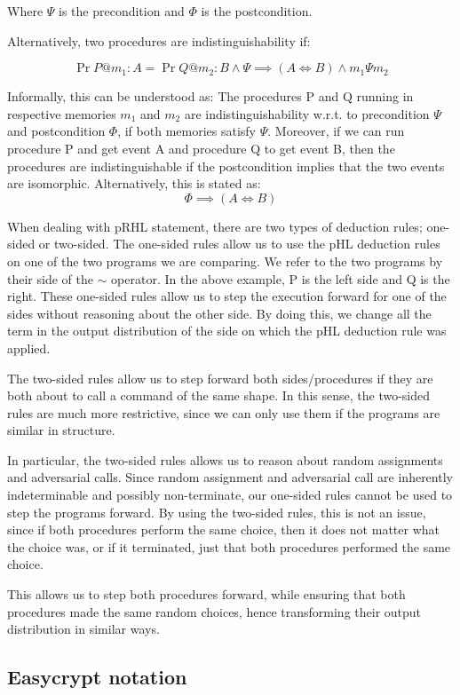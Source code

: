 Where $\Psi$ is the precondition and $\Phi$ is the postcondition.

Alternatively, two procedures are indistinguishability if:

\[
  \Pr{P @ m_{1} : A} = \Pr{Q @ m_{2} : B} \land \Psi \implies (A \iff B) \land m_{1} \Psi m_{2}
\]

Informally, this can be understood as: The procedures P and Q running in
respective memories $m_{1}$ and $m_{2}$ are indistinguishability w.r.t. to
precondition $\Psi$ and postcondition $\Phi$, if both memories satisfy $\Psi$.
Moreover, if we can run procedure P and get event A and
procedure Q to get event B, then the procedures are indistinguishable if the
postcondition implies that the two events are isomorphic. Alternatively, this is
stated as:
\[
  \Phi \implies (A \iff B)
\]


When dealing with pRHL statement, there are two types of deduction rules;
one-sided or two-sided.
The one-sided rules allow us to use the pHL deduction rules on one of the
two programs we are comparing. We refer to the two programs by their
side of the $\sim$ operator. In the above example, P is the left side and Q is
the right.
These one-sided rules allow us to step the execution forward for one of the sides without
reasoning about the other side.
By doing this, we change all the term in the output distribution of the side on
which the pHL deduction rule was applied.

The two-sided rules allow us to step forward both sides/procedures if they are both about to call
a command of the same shape. In this sense, the two-sided rules are much more
restrictive, since we can only use them if the programs are similar in structure.

In particular, the two-sided rules allows us to reason about random assignments
and adversarial calls.
Since random assignment and adversarial call are inherently indeterminable and possibly
non-terminate, our one-sided rules cannot be used to step the programs forward.
By using the two-sided rules, this is not an issue,
since if both procedures perform the same choice, then it does not
matter what the choice was, or if it terminated, just that both procedures
performed the same choice.

This allows us to step both procedures forward, while ensuring that both
procedures made the same random choices, hence transforming their output
distribution in similar ways.

\subsection{Easycrypt notation}
\label{sec:label}

